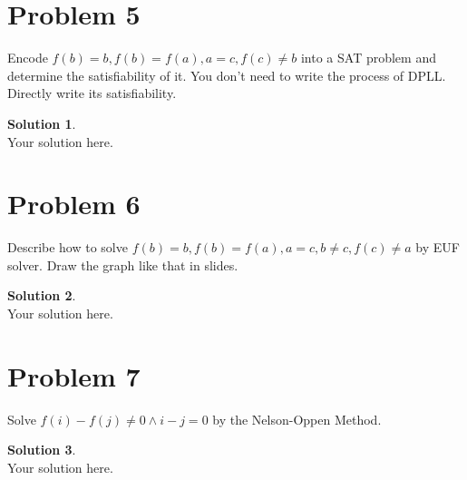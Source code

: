 \documentclass[a4paper,UTF8]{article}
\theoremstyle{definition}
\newtheorem*{solution}{Solution}
\begin{document}
\section*{Problem 5}
Encode $f(b)=b, f(b)=f(a), a=c,  f(c)\neq b$ into a SAT problem and determine the satisfiability of it. You don't need to write the process of DPLL. Directly write its satisfiability.
\begin{solution}
~\\
Your solution here.
\end{solution}


\section*{Problem 6}
Describe how to solve $f(b)=b, f(b)=f(a), a=c, b\neq c, f(c)\neq a$ by EUF solver. Draw the graph like that in slides.
\begin{solution}
~\\
Your solution here.
\end{solution}


\section*{Problem 7}
Solve $ f(i) - f(j)\neq 0\wedge i-j= 0 $ by the Nelson-Oppen Method.
\begin{solution}
~\\
Your solution here.
\end{solution}
\end{document}
